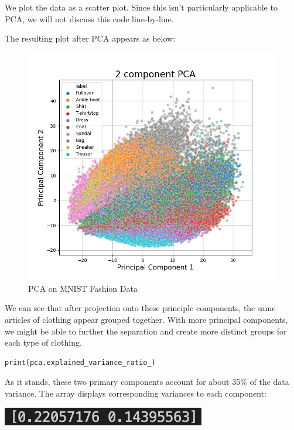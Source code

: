 \documentclass{article}
\begin{document}
\noindent We plot the data as a scatter plot. Since this isn't particularly applicable to PCA, we will not discuss this code line-by-line.

\noindent The resulting plot after PCA appears as below:

\begin{figure}[h]
    \centering
    \includegraphics[scale=0.65]{images/fashionMNIST_plot.png}
    \caption{PCA on MNIST Fashion Data}
\end{figure}

\noindent We can see that after projection onto these principle components, the same articles of clothing appear grouped together. With more principal components, we might be able to further the separation and create more distinct groups for each type of clothing.

\begin{lstlisting}
print(pca.explained_variance_ratio_)
\end{lstlisting}

\noindent As it stands, these two primary components account for about 35\% of the data variance. The array displays corresponding variances to each component:

\begin{center}
  \includegraphics{images/variance.png}  
\end{center}
\end{document}
